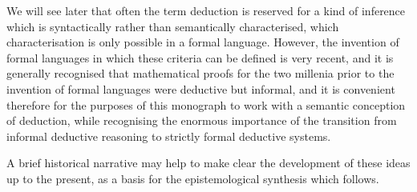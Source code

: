 \documentclass[10pt,titlepage]{book}
\begin{document}
We will see later that often the term deduction is reserved for a kind of inference which is syntactically rather than semantically characterised, which characterisation is only possible in a formal language.
However, the invention of formal languages in which these criteria can be defined is very recent, and it is generally recognised that mathematical proofs for the two millenia prior to the invention of formal languages were deductive but informal, and it is convenient therefore for the purposes of this monograph to work with a semantic conception of deduction, while recognising the enormous importance of the transition from informal deductive reasoning to strictly formal deductive systems.

A brief historical narrative may help to make clear the development of these ideas up to the present, as a basis for the epistemological synthesis which follows.
\end{document}
